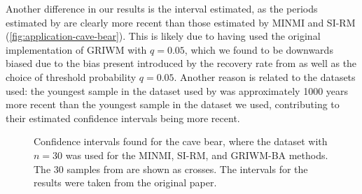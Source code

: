 Another difference in our results is the interval estimated, as the periods estimated by \citet{Baca2016} are clearly more recent than those estimated by MINMI and SI-RM (\autoref{fig:application-cave-bear}). This is likely due to \citet{Baca2016} having used the original implementation of GRIWM with $q = 0.05$, which we found to be downwards biased due to the bias present introduced by the recovery rate from \citet{Mcinerny2006} as well as the choice of threshold probability $q=0.05$. Another reason is related to the datasets used: the youngest sample in the dataset used by \citet{Baca2016} was approximately 1000 years more recent than the youngest sample in the dataset we used, contributing to their estimated confidence intervals being more recent.
\begin{figure}[ht]
    \centering
    
    \caption{Confidence intervals found for the cave bear, where the \citet{Cooper2015} dataset with $n=30$ was used for the MINMI, SI-RM, and GRIWM-BA methods. The 30 samples from \citet{Cooper2015} are shown as crosses. The intervals for the \citet{Baca2016} results were taken from the original paper.}
    \label{fig:application-cave-bear}
\end{figure}